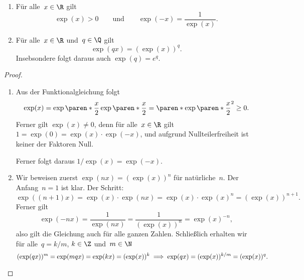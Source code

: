 \documentclass[a4paper]{article}
\begin{document}
\begin{corollary}\leavevmode
    \begin{enumerate}
        \item Für alle~$x \in \R$ gilt
        \begin{equation*}
            \exp(x) > 0 \qquad\text{und}\qquad \exp(-x) = \frac{1}{\exp(x)}.
        \end{equation*}
        \item Für alle~$x \in \R$ und~$q \in \Q$ gilt
        \begin{equation*}
            \exp(qx) = (\exp(x))^q.
        \end{equation*}
        Insebsondere folgt daraus auch $\exp(q) = e^q$.
    \end{enumerate}
\end{corollary}

\begin{proof}\leavevmode
    \begin{enumerate}
        \item Aus der Funktionalgleichung folgt
        \begin{equation*}
            \exp(x) = \exp\paren*{\frac{x}{2}} \exp\paren*{\frac{x}{2}} = \paren*{\exp\paren*{\frac{x}{2}}}^2 \geq 0.
        \end{equation*}
        Ferner gilt $\exp(x) \neq 0$, denn für alle~$x \in \R$ gilt $1 = \exp(0) = \exp(x) \cdot \exp(-x)$, und aufgrund Nullteilerfreiheit ist keiner der Faktoren Null.

        Ferner folgt daraus $1/\exp(x) = \exp(-x)$.
        \item Wir beweisen zuerst $\exp(nx) = (\exp(x))^n$ für natürliche~$n$. Der Anfang~$n = 1$ ist klar. Der Schritt:
        \begin{equation*}
            \exp((n+1)x) = \exp(x) \cdot \exp(nx) = \exp(x) \cdot \exp(x)^n = (\exp(x))^{n+1}.
        \end{equation*}
        Ferner gilt
        \begin{equation*}
            \exp(-nx) = \frac{1}{\exp(nx)} = \frac{1}{(\exp(x))^n} = \exp(x)^{-n},
        \end{equation*}
        also gilt die Gleichung auch für alle ganzen Zahlen. Schließlich erhalten wir für alle~$q = k/m$, $k \in \Z$ und~$m \in \N$
        \begin{equation*}
            (\exp(qx))^m = \exp(mqx) = \exp(kx) = (\exp(x))^k \implies \exp(qx) = (\exp(x))^{k/m} = (\exp(x))^q. \qedhere
        \end{equation*}
    \end{enumerate}
\end{proof}
\end{document}
